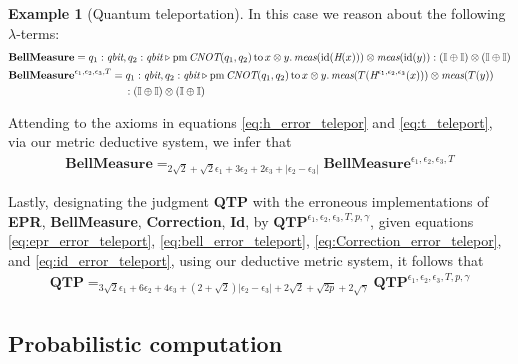 \documentclass[10pt,a4paper]{amsart}
\theoremstyle{definition}
\theoremstyle{definition}
\newtheorem{example}[definition]{Example}
\theoremstyle{definition}
\theoremstyle{definition}
\theoremstyle{definition}
\theoremstyle{definition}
\begin{document}
\begin{example}[Quantum teleportation]
    In this case we reason about the following $\lambda$-terms:
    \begin{align*}
      &\textbf{BellMeasure} =  q_{1}: \textit{qbit}, q_{2}: \textit{qbit}
      \vljud  \text{pm} \, \textit{CNOT} (q_{1},q_{2})
     \,  \text{to}\, x \otimes y. \,
      \textit{meas} (\id(\textit{H} (x))) \otimes \textit{meas} ( \id(y)) :
      \left(\typeI\oplus \typeI\right) \otimes \left(\typeI\oplus
      \typeI\right) \\
      &\textbf{BellMeasure}^{\epsilon_1, \epsilon_2,\epsilon_3,T} =  q_{1}: \textit{qbit}, q_{2}: \textit{qbit}
      \vljud  \text{pm} \, \textit{CNOT} (q_{1},q_{2})
     \,  \text{to}\, x \otimes y. \,
      \textit{meas} (T(\textit{H}^{\epsilon_1, \epsilon_2,\epsilon_3} (x))) \otimes \textit{meas} ( T(y)) \\
      &\hspace{110pt}:\left(\typeI\oplus \typeI\right) \otimes \left(\typeI\oplus
      \typeI\right) \\
    \end{align*}
  
  Attending to the axioms in equations \eqref{eq:h_error_telepor} and \eqref{eq:t_teleport}, via our metric deductive system, we infer that
  \begin{align} \label{eq:bell_error_teleport}
    \textbf{BellMeasure} =_{2 \sqrt{2} + \sqrt{2}\epsilon_1 + 3\epsilon_2 + 2\epsilon_3 + |\epsilon_2-\epsilon_3|} \textbf{BellMeasure}^{\epsilon_1, \epsilon_2,\epsilon_3,T}
  \end{align}

  Lastly, designating the judgment \textbf{QTP} with the erroneous implementations of \textbf{EPR}, \textbf{BellMeasure}, \textbf{Correction}, \textbf{Id}, by $\textbf{QTP}^{\epsilon_1, \epsilon_2,\epsilon_3,T,p,\gamma}$, given equations \eqref{eq:epr_error_teleport}, \eqref{eq:bell_error_teleport}, \eqref{eq:Correction_error_telepor}, and  \eqref{eq:id_error_teleport}, using our deductive metric system, it follows that
  \begin{align*}
    \textbf{QTP} =_{ 3\sqrt{2}\epsilon_1 + 6\epsilon_2 + 4\epsilon_3 + (2+\sqrt{2})|\epsilon_2-\epsilon_3| + 2 \sqrt{2} + \sqrt{2p}  +2\sqrt{\gamma}} \textbf{QTP}^{\epsilon_1, \epsilon_2,\epsilon_3,T,p,\gamma}
  \end{align*}
  \end{example}



  \subsection{Probabilistic computation}
\end{document}
